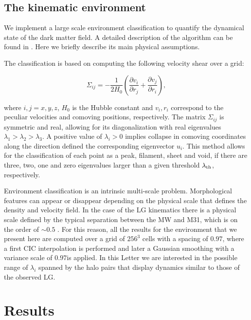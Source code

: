 \documentclass{emulateapj}
\newcommand{\hMpc}{{\ifmmode{h^{-1}{\rm Mpc}}\else{$h^{-1}$Mpc }\fi}}
\begin{document}
\subsection{The kinematic environment}
We implement a large scale environment classification to quantify the dynamical state of the dark matter field. A detailed description of the algorithm can be found in \cite{Hoffman12}. Here we briefly describe its main physical assumptions.

The classification is based on computing the following velocity shear over a grid:

\begin{equation}
\Sigma_{ij}=-\frac{1}{2H_{0}}\left(\frac{\partial v_{i}}{\partial r_{j}}+\frac{\partial v_{j}}{\partial r_{i}}\right),
\end{equation}

where $i,j=x,y,z$, $H_{0}$ is the Hubble constant and $v_{i}, r_{i}$ correspond to the peculiar velocities and comoving positions, respectively. The matrix  $\Sigma_{ij}$ is symmetric and real, allowing for its diagonalization with real eigenvalues $\lambda_{1}>\lambda_{2}>\lambda_{3}$. A positive value of $\lambda_{i}>0$ implies collapse in comoving coordinates along the direction defined the corresponding eigenvector $u_{i}$. This method allows for the classification of each point as a peak, filament, sheet and void, if there are three, two, one and zero eigenvalues larger than a given threshold $\lambda_{\rm th}$, respectively.


Environment classification is an intrinsic multi-scale problem. Morphological features can appear or disappear depending on the physical scale that defines the density and velocity field. In the case of the LG kinematics there is a physical scale defined by the typical separation between the MW and M31, which is on the order of $\sim 0.5$ \hMpc. For this reason, all the results for the environment that we present here are computed over a grid of $256^3$ cells with a spacing of $0.97$\hMpc, where a first CIC interpolation is performed and later a Gaussian smoothing with a variance scale of $0.97$\hMpc is applied. In this Letter we are interested in the possible range of $\lambda_{i}$ spanned by the halo pairs that display dynamics similar to those of the observed LG. 


\section{Results}
\label{sec:results}
\end{document}
